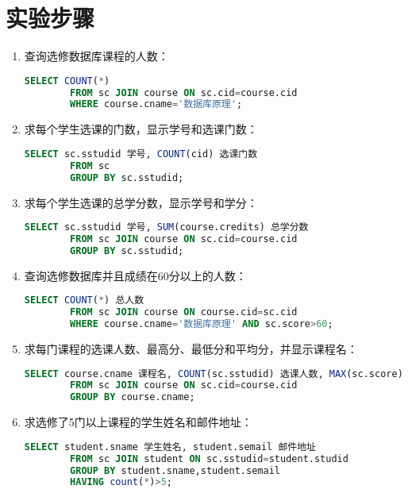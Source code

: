 \documentclass[a4paper]{uestcreport}
\begin{document}
\section{实验步骤}
\begin{enumerate}
    \item 查询选修数据库课程的人数：
          \begin{lstlisting}[language=SQL]
        SELECT COUNT(*)
        FROM sc JOIN course ON sc.cid=course.cid
        WHERE course.cname='数据库原理';
    \end{lstlisting}
    \item 求每个学生选课的门数，显示学号和选课门数：
          \begin{lstlisting}[language=SQL]
        SELECT sc.sstudid 学号, COUNT(cid) 选课门数
        FROM sc
        GROUP BY sc.sstudid;
    \end{lstlisting}
    \item 求每个学生选课的总学分数，显示学号和学分：
          \begin{lstlisting}[language=SQL]
        SELECT sc.sstudid 学号, SUM(course.credits) 总学分数
        FROM sc JOIN course ON sc.cid=course.cid
        GROUP BY sc.sstudid;
    \end{lstlisting}
    \item 查询选修数据库并且成绩在60分以上的人数：
          \begin{lstlisting}[language=SQL]
        SELECT COUNT(*) 总人数
        FROM sc JOIN course ON course.cid=sc.cid
        WHERE course.cname='数据库原理' AND sc.score>60;
    \end{lstlisting}
    \item 求每门课程的选课人数、最高分、最低分和平均分，并显示课程名：
          \begin{lstlisting}[language=SQL]
        SELECT course.cname 课程名, COUNT(sc.sstudid) 选课人数, MAX(sc.score) 最高分, MIN(sc.score) 最低分, AVG(sc.score) 平均分
        FROM sc JOIN course ON sc.cid=course.cid
        GROUP BY course.cname;
    \end{lstlisting}
    \item 求选修了5门以上课程的学生姓名和邮件地址：
          \begin{lstlisting}[language=SQL]
        SELECT student.sname 学生姓名, student.semail 邮件地址
        FROM sc JOIN student ON sc.sstudid=student.studid
        GROUP BY student.sname,student.semail
        HAVING count(*)>5;
    \end{lstlisting}
\end{enumerate}
\end{document}
